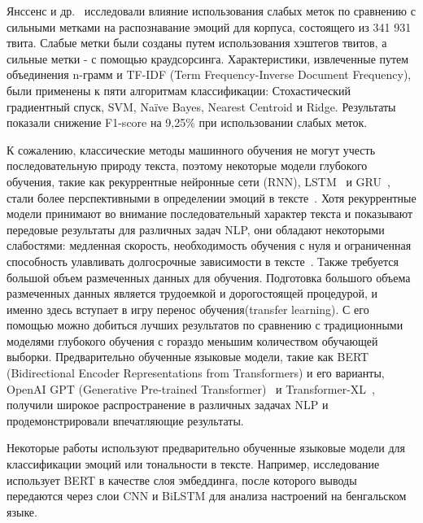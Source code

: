 \documentclass{article}
\begin{document}
Янссенс и др.~\cite{janssens} исследовали влияние использования слабых меток по сравнению с сильными метками на распознавание эмоций для корпуса, состоящего из 341 931 твита. Слабые метки были созданы путем использования хэштегов твитов, а сильные метки - с помощью краудсорсинга. Характеристики, извлеченные путем объединения n-грамм и TF-IDF (Term Frequency-Inverse Document Frequency), были применены к пяти алгоритмам классификации: Стохастический градиентный спуск, SVM, Naïve Bayes, Nearest Centroid и Ridge. Результаты показали снижение F1-score на 9,25\% при использовании слабых меток.

К сожалению, классические методы машинного обучения не могут учесть последовательную природу текста, поэтому некоторые модели глубокого обучения, такие как рекуррентные нейронные сети (RNN), LSTM~\cite{hochreiter1} и GRU~\cite{cho}, стали более перспективными в определении эмоций в тексте~\cite{kratzwald, chatterjee, xu}. Хотя рекуррентные модели принимают во внимание последовательный характер текста и показывают передовые результаты для различных задач NLP, они обладают некоторыми слабостями: медленная скорость, необходимость обучения с нуля и ограниченная способность улавливать долгосрочные зависимости в тексте~\cite{hochreiter2}. Также требуется большой объем размеченных данных для обучения. Подготовка большого объема размеченных данных является трудоемкой и дорогостоящей процедурой, и именно здесь вступает в игру перенос обучения(transfer learning). С его помощью можно добиться лучших результатов по сравнению с традиционными моделями глубокого обучения с гораздо меньшим количеством обучающей выборки. Предварительно обученные языковые модели, такие как BERT~\cite{devlin} (Bidirectional Encoder Representations from Transformers) и его варианты, OpenAI GPT (Generative Pre-trained Transformer)~\cite{radford} и Transformer-XL~\cite{dai}, получили широкое распространение в различных задачах NLP и продемонстрировали впечатляющие результаты.

 Некоторые работы используют предварительно обученные языковые модели для классификации эмоций или тональности в тексте. Например, исследование~\cite{prottasha} использует BERT в качестве слоя эмбеддинга, после которого выводы передаются через слои CNN и BiLSTM для анализа настроений на бенгальском языке.
\end{document}
